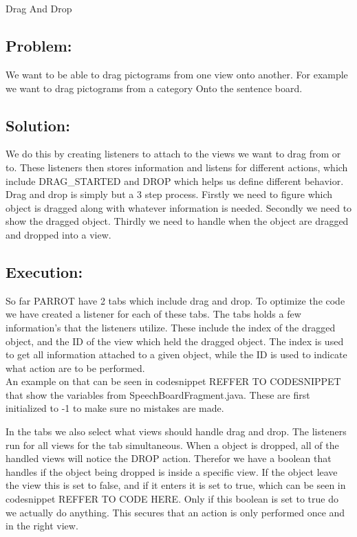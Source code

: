 \section{} Drag And Drop
\subsection{Problem:}
We want to be able to drag pictograms from one view onto another. 
For example we want to drag pictograms from a category Onto the sentence board. 


\subsection{Solution:}
We do this by creating listeners to attach to the views we want to drag from or to. 
These listeners then stores information and listens for different actions, which include DRAG\_STARTED and DROP which helps us define different behavior.
Drag and drop is simply but a 3 step process.
Firstly we need to figure which object is dragged along with whatever information is needed. 
Secondly we need to show the dragged object.
Thirdly we need to handle when the object are dragged and dropped into a view.

\subsection{Execution:}
So far PARROT have 2 tabs which include drag and drop. To optimize the code we have created a listener for each of these tabs.
The tabs holds a few information's that the listeners utilize. These include the index of the dragged object, and the ID of the view which held the dragged object. The index is used to get all information attached to a given object, while the ID is used to indicate what action are to be performed.\\
An example on that can be seen in codesnippet REFFER TO CODESNIPPET that show the variables from SpeechBoardFragment.java.
These are first initialized to -1 to make sure no mistakes are made.


In the tabs we also select what views should handle drag and drop.
The listeners run for all views for the tab simultaneous. When a object is dropped, all of the handled views will notice the DROP action. Therefor we have a boolean that handles if the object being dropped is inside a specific view. 
If the object leave the view this is set to false, and if it enters it is set to true, which can be seen in codesnippet REFFER TO CODE HERE. 
Only if this boolean is set to true do we actually do anything. This secures that an action is only performed once and in the right view. 

